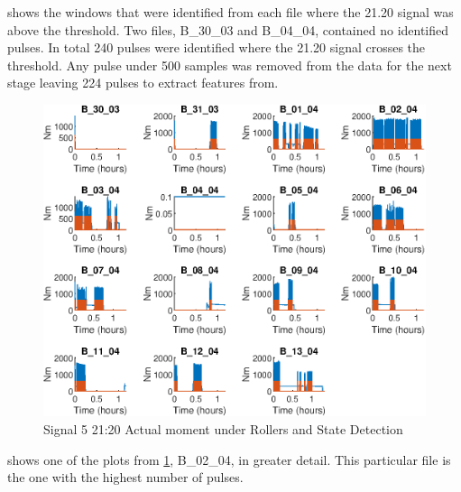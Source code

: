 \documentclass[]{article}
\begin{document}
 shows the windows that were identified from each file where the 21.20 signal was above the threshold. Two files, B\_30\_03 and B\_04\_04, contained no identified pulses. In total 240 pulses were identified where the 21.20 signal crosses the threshold. Any pulse under 500 samples was removed from the data for the next stage leaving 224 pulses to extract features from.

\begin{figure}[H]
    \centering
    \includegraphics[width=\textwidth, height=\textheight, keepaspectratio]{figures/StateDetectionFig.eps}
    \caption{Signal 5 21:20 Actual moment under Rollers and State Detection}
    \label{fig:StateDetection}
\end{figure}

 shows one of the plots from \cref{fig:StateDetection}, B\_02\_04, in greater detail. This particular file is the one with the highest number of pulses.
\end{document}
